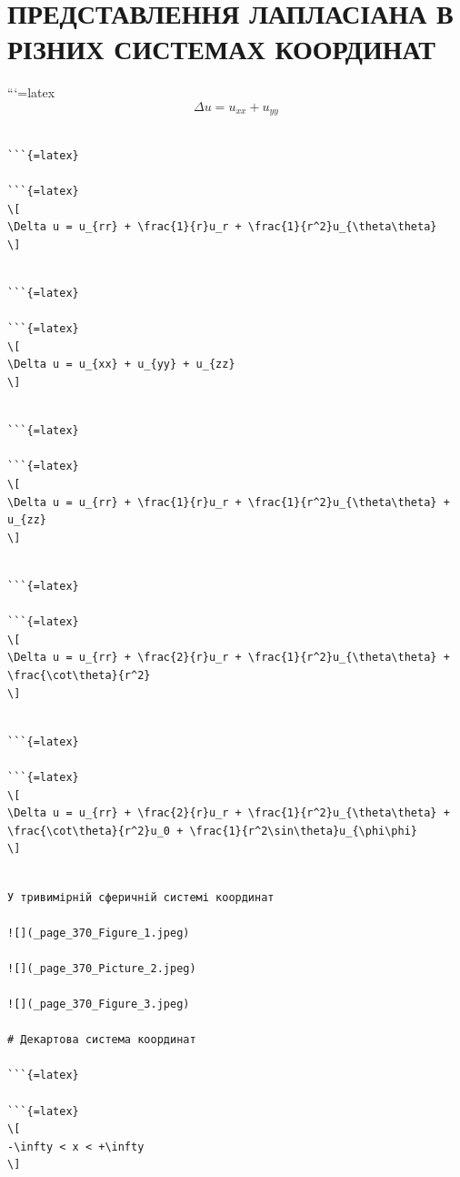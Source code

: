 \documentclass[
]{article}
\begin{document}
\section{ПРЕДСТАВЛЕННЯ ЛАПЛАСІАНА В РІЗНИХ СИСТЕМАХ
КООРДИНАТ}\label{ux43fux440ux435ux434ux441ux442ux430ux432ux43bux435ux43dux43dux44f-ux43bux430ux43fux43bux430ux441ux456ux430ux43dux430-ux432-ux440ux456ux437ux43dux438ux445-ux441ux438ux441ux442ux435ux43cux430ux445-ux43aux43eux43eux440ux434ux438ux43dux430ux442}

```{=latex}
\[
\Delta u = u_{xx} + u_{yy}
\]

\begin{verbatim}

```{=latex}

```{=latex}
\[
\Delta u = u_{rr} + \frac{1}{r}u_r + \frac{1}{r^2}u_{\theta\theta}
\]
\end{verbatim}

\begin{verbatim}

```{=latex}

```{=latex}
\[
\Delta u = u_{xx} + u_{yy} + u_{zz}
\]
\end{verbatim}

\begin{verbatim}

```{=latex}

```{=latex}
\[
\Delta u = u_{rr} + \frac{1}{r}u_r + \frac{1}{r^2}u_{\theta\theta} + u_{zz}
\]
\end{verbatim}

\begin{verbatim}

```{=latex}

```{=latex}
\[
\Delta u = u_{rr} + \frac{2}{r}u_r + \frac{1}{r^2}u_{\theta\theta} + \frac{\cot\theta}{r^2}
\]
\end{verbatim}

\begin{verbatim}

```{=latex}

```{=latex}
\[
\Delta u = u_{rr} + \frac{2}{r}u_r + \frac{1}{r^2}u_{\theta\theta} + \frac{\cot\theta}{r^2}u_0 + \frac{1}{r^2\sin\theta}u_{\phi\phi}
\]
\end{verbatim}

\begin{verbatim}

У тривимірній сферичній системі координат

![](_page_370_Figure_1.jpeg)

![](_page_370_Picture_2.jpeg)

![](_page_370_Figure_3.jpeg)

# Декартова система координат

```{=latex}

```{=latex}
\[
-\infty < x < +\infty
\]
\end{verbatim}
\end{document}
